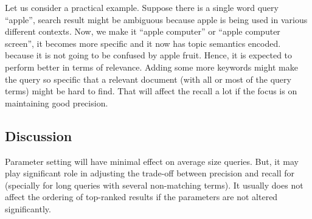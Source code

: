 \documentclass[letterpaper,12pt]{article}
\begin{document}
Let us consider a practical example. Suppose there is a single word query ``apple'', search result might be ambiguous because apple is being used in various different contexts. Now, we make it ``apple computer'' or ``apple computer screen'', it becomes more specific and it now has topic semantics encoded. because it is not going to be confused by apple fruit. Hence, it is expected to perform better in terms of relevance. Adding some more keywords might make the query so specific that a relevant document (with all or most of the query terms) might be hard to find. That will affect the recall a lot if the focus is on maintaining good precision.

\subsection{Discussion}

Parameter setting will have minimal effect on average size queries. But, it may play significant role in adjusting the trade-off between precision and recall for (specially for long queries with several non-matching terms). It usually does not affect the ordering of top-ranked results if the parameters are not altered significantly.





\end{document}
